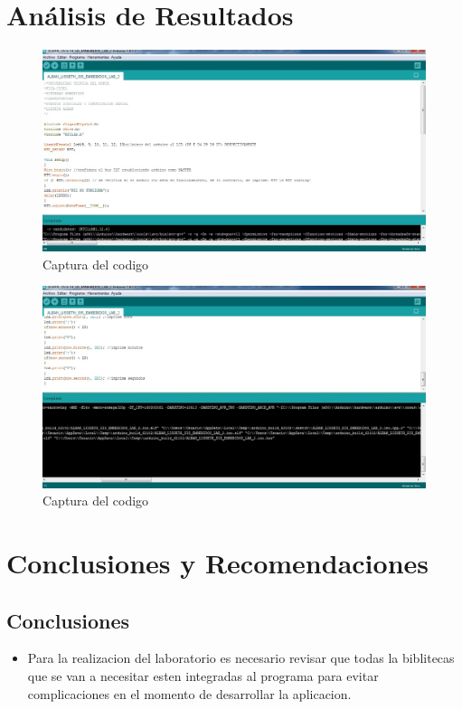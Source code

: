 \documentclass[10pt,a4paper]{article}
\begin{document}
\section{Análisis de Resultados}
\begin{figure}[hbtp]
\caption{Captura del codigo}
\centering
\includegraphics[scale=0.3]{ARDUINO.jpg}
\end{figure}
\begin{figure}[hbtp]
\caption{Captura del codigo}
\centering
\includegraphics[scale=0.3]{ARDUINO1.jpg}
\end{figure}

\section{Conclusiones y Recomendaciones}
\subsection{Conclusiones}
\begin{itemize}
\item Para la realizacion del laboratorio es necesario revisar que todas la biblitecas que se van a necesitar esten integradas al programa para evitar complicaciones en el momento de desarrollar la aplicacion.
\end{itemize}
\\
\end{document}
